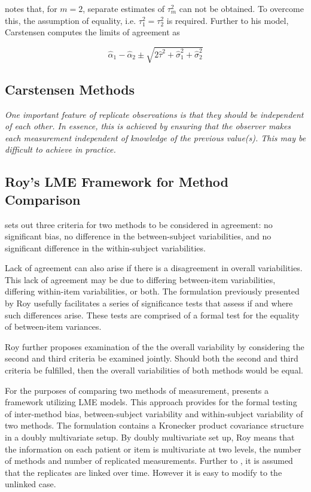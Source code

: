 \documentclass[12pt, a4paper]{report}
\theoremstyle{plain}
\theoremstyle{definition}
\theoremstyle{remark}
\begin{document}
\citet{BXC2008} notes that, for $m=2$, separate estimates of $\tau^2_m$ can not be obtained. To overcome this, the assumption of equality, i.e. $\tau^2_1 = \tau^2_2$ is required. Further to his model, Carstensen computes the limits of agreement
as

\[
\hat{\alpha}_1 - \hat{\alpha}_2 \pm \sqrt{2 \hat{\tau}^2 +
	\hat{\sigma}^2_1 + \hat{\sigma}^2_2}
\]


	


	
	\subsection{Carstensen Methods}





\emph{
		One important feature of replicate observations is that they should be independent	of each other. In essence, this is achieved by ensuring that the observer makes each
		measurement independent of knowledge of the previous value(s). This may be difficult
		to achieve in practice.}
	
	


\subsection{Roy's LME Framework for Method Comparison }
\citet{Barnhart} sets out three criteria for two methods to be considered in agreement: no significant bias, no difference in the between-subject variabilities, and no significant difference in the within-subject variabilities. 


Lack of agreement can also arise if there is a disagreement in overall variabilities. This lack of agreement may be due to differing between-item variabilities, differing within-item variabilities, or both. The formulation previously presented by Roy usefully facilitates a series of significance tests that assess if and where such differences arise. These tests are comprised of a formal test for the equality of between-item variances. 

Roy further proposes examination of the the overall variability by considering the second and third criteria be examined jointly. Should both the second and third criteria be fulfilled, then the overall variabilities of both methods would be equal.
	
For the purposes of comparing two methods of measurement, \citet{ARoy2009} presents a framework utilizing LME models. This approach provides for the formal testing of inter-method bias, between-subject variability and within-subject variability of two methods. The formulation contains a Kronecker product covariance structure in a doubly multivariate setup. By doubly multivariate set up, Roy means that the information on each patient or item is multivariate at two levels, the number of methods and number of replicated measurements. Further to \citet{lam}, it is assumed that the replicates are linked over time. However it is easy to modify to the unlinked case.
	
\end{document}
